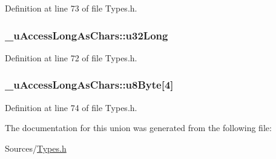 Definition at line 73 of file Types.\+h.

\subsubsection[{\texorpdfstring{u32\+Long}{u32Long}}]{ \+\_\+u\+Access\+Long\+As\+Chars\+::u32\+Long}\hypertarget{union__u_access_long_as_chars_a19e4d300562996e12ee1de6bea3afe59}{}\label{union__u_access_long_as_chars_a19e4d300562996e12ee1de6bea3afe59}


Definition at line 72 of file Types.\+h.

\subsubsection[{\texorpdfstring{u8\+Byte}{u8Byte}}]{ \+\_\+u\+Access\+Long\+As\+Chars\+::u8\+Byte\mbox{[}4\mbox{]}}\hypertarget{union__u_access_long_as_chars_a7c798b474ed7a43a1d51624845e9a192}{}\label{union__u_access_long_as_chars_a7c798b474ed7a43a1d51624845e9a192}


Definition at line 74 of file Types.\+h.



The documentation for this union was generated from the following file\+:\begin{DoxyCompactItemize}
\item 
Sources/\hyperlink{_types_8h}{Types.\+h}\end{DoxyCompactItemize}
